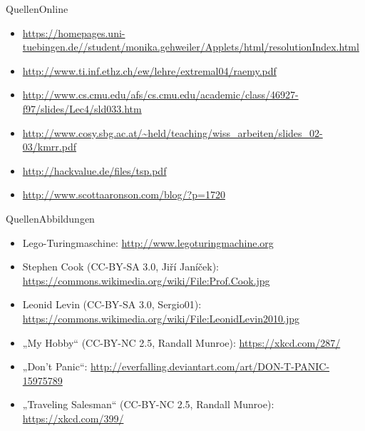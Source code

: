 \documentclass[ignorenonframetext,]{beamer}
\begin{document}
\begin{frame}{Quellen}{Online}
\begin{itemize}
	\item \url{https://homepages.uni-tuebingen.de//student/monika.gehweiler/Applets/html/resolutionIndex.html}
	\item \url{http://www.ti.inf.ethz.ch/ew/lehre/extremal04/raemy.pdf}
	\item \url{http://www.cs.cmu.edu/afs/cs.cmu.edu/academic/class/46927-f97/slides/Lec4/sld033.htm}
	\item \url{http://www.cosy.sbg.ac.at/~held/teaching/wiss\_arbeiten/slides\_02-03/kmrr.pdf}
	\item \url{http://hackvalue.de/files/tsp.pdf}
	\item \url{http://www.scottaaronson.com/blog/?p=1720}
\end{itemize}
\end{frame}

\begin{frame}{Quellen}{Abbildungen}
\begin{itemize}
	\item Lego-Turingmaschine: \url{http://www.legoturingmachine.org}
	\item Stephen Cook (CC-BY-SA 3.0, Jiří Janíček):
		\url{https://commons.wikimedia.org/wiki/File:Prof.Cook.jpg}
	\item Leonid Levin (CC-BY-SA 3.0, Sergio01):
		\url{https://commons.wikimedia.org/wiki/File:LeonidLevin2010.jpg}
	\item „My Hobby“ (CC-BY-NC 2.5, Randall Munroe): \url{https://xkcd.com/287/}
	\item „Don't Panic“: \url{http://everfalling.deviantart.com/art/DON-T-PANIC-15975789}
	\item „Traveling Salesman“ (CC-BY-NC 2.5, Randall Munroe): \url{https://xkcd.com/399/}
\end{itemize}
\end{frame}
\end{document}
